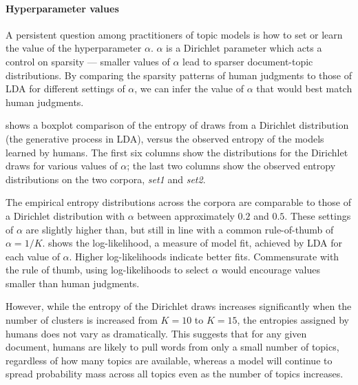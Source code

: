 \paragraph{Hyperparameter values} A persistent question among
practitioners of topic models is how to set or learn the value of the
hyperparameter $\alpha$.  $\alpha$ is a Dirichlet parameter which acts
a control on sparsity --- smaller values of $\alpha$ lead to sparser
document-topic distributions.  By comparing the sparsity patterns of
human judgments to those of LDA for different settings of $\alpha$, we
can infer the value of $\alpha$ that would best match human judgments.

 shows a boxplot comparison of the entropy of draws
from a Dirichlet distribution (the generative process in LDA), versus
the observed entropy of the models learned by humans.  The first six
columns show the distributions for the Dirichlet draws for various
values of $\alpha$; the last two columns show the observed entropy
distributions on the two corpora, \emph{set1} and \emph{set2}.

The empirical entropy distributions across the corpora are comparable
to those of a Dirichlet distribution with $\alpha$ between
approximately $0.2$ and $0.5$.  These settings of $\alpha$ are
slightly higher than, but still in line with a common rule-of-thumb of
$\alpha = 1 / K$.   shows the log-likelihood, a measure
of model fit, achieved by LDA for each value of $\alpha$.  Higher
log-likelihoods indicate better fits.  Commensurate with the rule of
thumb, using log-likelihoods to select $\alpha$ would encourage values
smaller than human judgments.

However, while the entropy of the Dirichlet draws increases
significantly when the number of clusters is increased from $K=10$ to
$K=15$, the entropies assigned by humans does not vary as
dramatically.  This suggests that for any given document, humans are
likely to pull words from only a small number of topics, regardless of
how many topics are available, whereas a model will continue to spread
probability mass across all topics even as the number of topics
increases.
